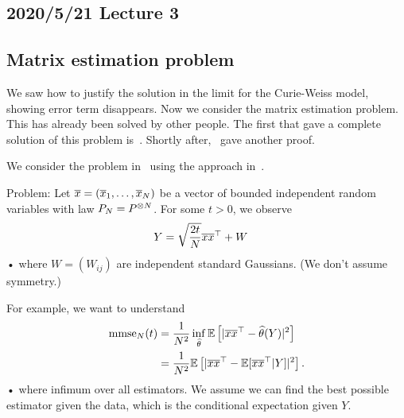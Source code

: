 \subsection*{2020/5/21 Lecture 3}

\subsection{Matrix estimation problem}

We saw how to justify the solution in the limit for the Curie-Weiss model, showing error term disappears. Now we consider the matrix estimation problem. This has already been solved by other people. The first that gave a complete solution of this problem is~\cite{lelarge2019fundamental}. Shortly after,~\cite{barbier2019adaptive} gave another proof. 

We consider the problem in~\cite{mourrat2018hamilton} using the approach in~\cite{mourrat2019hamilton}.


Problem: Let $\overline{x} = (\overline{x}_1,\ldots, \overline{x}_N)$ be a vector of bounded independent random variables with law $P_N=P^{\otimes N}$. For some $t>0$, we observe
\begin{align*}
Y &= \sqrt{\frac{2t}{N}} \overline{x} \overline{x}^\top +W
\end{align*}•
where $W=(W_{ij})$ are independent standard Gaussians. (We don't assume symmetry.)


For example, we want to understand
\begin{align*}
\text{mmse}_N(t) &= \frac{1}{N^2}  \inf_{\widehat{\theta}} \mathbb{E}\left[ {|\overline{x} \overline{x}^\top - \widehat{\theta} (Y)|^2} \right]\\
& = \frac{1}{N^2} \mathbb{E} \left[ {|\overline{x}\overline{x}^\top - \mathbb{E}[\overline{x}\overline{x}^\top |Y]|^2} \right].
\end{align*}•
where infimum over all estimators. We assume we can find the best possible estimator given the data, which is the conditional expectation given $Y$.

